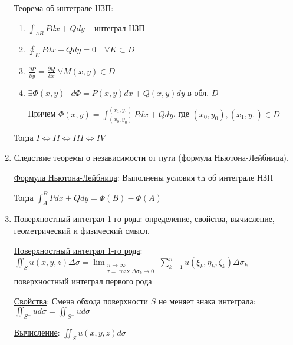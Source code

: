 \documentclass[12pt]{article}
\begin{document}
\begin{enumerate}
        \hyperlink{theorempathindependentintegrals}{Теорема об интеграле НЗП}:

        \begin{enumerate}[label=\Roman*.]

        \item $\int_{AB} Pdx + Qdy$ -- интеграл НЗП

        \item $\oint_K Pdx + Qdy = 0 \quad \forall K \subset D$

        \item $\frac{\partial P}{\partial y} = \frac{\partial Q}{\partial x} \ \forall M(x, y) \in D$

        \item $\exists \Phi(x, y) \ | \ d\Phi = P(x, y)dx + Q(x, y)dy$ в обл. $D$

        Причем $\Phi(x, y) = \int_{(x_0,y_0)}^{(x_1,y_1)}Pdx+Qdy$, где $(x_0, y_0), (x_1,y_1) \in D$

        \end{enumerate}

        Тогда $I \Longleftrightarrow II \Longleftrightarrow III \Longleftrightarrow IV$

        \item Следствие теоремы о независимости от пути (формула Ньютона-Лейбница).

        \hyperlink{theoremNewtonLeibnizforpathindependantintegral}{Формула Ньютона-Лейбница}:
        Выполнены условия th об интеграле НЗП

        Тогда $\int_A^B Pdx + Qdy = \Phi(B) - \Phi(A)$

        \item Поверхностный интеграл 1-го рода: определение, свойства, вычисление, геометрический и физический смысл.

        \hyperlink{surfaceintegraloffirstkind}{Поверхностный интеграл 1-го рода}:
        $\iint_S u(x, y, z) \Delta \sigma = \lim_{\substack{n \to \infty \\ \tau = \max \Delta \sigma_k \to 0}} \sum_{k = 1}^{n} u(\xi_k, \eta_k, \zeta_k) \Delta \sigma_k$ -- поверхностный интеграл первого рода

        \hyperlink{surfaceintegraloffirstkindproperties}{Свойства}: Смена обхода поверхности $S$ не меняет знака интеграла: $\iint_{S^+} u d\sigma = \iint_{S^-} u d\sigma$

        \hyperlink{surfaceintegraloffirstkindcalculation}{Вычисление}: $\iint_S u(x, y, z) d\sigma$


\end{enumerate}
\end{document}
